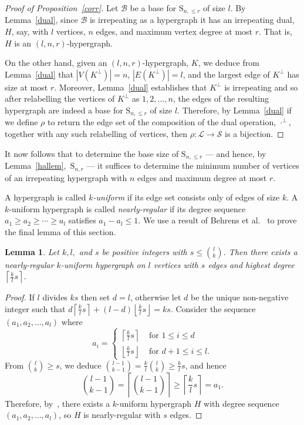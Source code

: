 \documentclass[10pt,a4paper]{amsart}
\renewcommand\S{\mathrm{S}}
\theoremstyle{plain}
\newtheorem{lemma}[cdrthm]{Lemma}
\theoremstyle{definition}
\theoremstyle{remark}
\begin{document}
\begin{proof}[Proof of Proposition~\ref{corr}]
Let $\mathcal{B}$ be a base for $\S_{n,\leq r}$ of size $l$. By Lemma~\ref{dual}, since $\mathcal{B}$ is irrepeating as a hypergraph it has an irrepeating dual, $H$, say, with $l$ vertices, $n$ edges, and maximum vertex degree at most $r$. That is, $H$ is an $(l,n,r)$-hypergraph. 

On the other hand, given an $(l,n,r)$-hypergraph, $K$, we deduce from Lemma~\ref{dual} that $|V(K^\perp)|=n$, $|E(K^\perp)|=l$, and the largest edge of $K^\perp$ has size at most $r$. Moreover, Lemma~\ref{dual} establishes that $K^\perp$ is irrepeating and so after relabelling the vertices of $K^\perp$ as $1,2,\dots,n$, the edges of the resulting hypergraph are indeed a base for $\S_{n,\leq r}$ of size $l$. Therefore, by Lemma~\ref{dual} if we define $\rho$ to return the edge set of the composition of the dual operation, $\cdot^\perp$, together with any such relabelling of vertices, then $\rho:\mathcal{L}\to\mathcal{S}$ is a bijection.
\end{proof}

It now follows that to determine the base size of $\S_{n,\leq r}$ --- and hence, by Lemma~\ref{hallem},~$\S_{n,r}$ --- it suffices to determine the minimum number of vertices of an irrepeating hypergraph with $n$ edges and maximum degree at most $r$. 

A hypergraph is called \emph{$k$-uniform} if its edge set consists only of edges of size $k$. A $k$-uniform hypergraph is called \emph{nearly-regular} if its degree sequence $a_1\geq a_2\geq\cdots\geq a_l$ satisfies $a_1-a_l\leq 1$. We use a result of Behrens et al.~\cite{beh} to prove the final lemma of this section.

\begin{lemma}\label{kexist}
Let $k,l,$ and $s$ be positive integers with $s\leq\binom{l}{k}$. Then there exists a nearly-regular $k$-uniform hypergraph on $l$ vertices with $s$ edges and highest degree $\left\lceil\frac{k}{l}s\right\rceil$.
\end{lemma}

\begin{proof}
If $l$ divides $ks$ then set $d=l$, otherwise let $d$ be the unique non-negative integer such that $d\left\lceil\frac{k}{l}s\right\rceil+(l-d)\left\lfloor\frac{k}{l}s\right\rfloor=ks$. Consider the sequence $(a_1,a_2,\dots,a_l)$ where $$a_i=\begin{cases}\left\lceil\frac{k}{l}s\right\rceil&\text{ for $1\leq i\leq d$}\\\left\lfloor\frac{k}{l}s\right\rfloor&\text{ for $d+1\leq i\leq l$}.\end{cases}$$ From $\binom{l}{k}\geq s$, we deduce $\binom{l-1}{k-1}=\frac{k}{l}\binom{l}{k}\geq\frac{k}{l}s$, and hence $$\binom{l-1}{k-1}=\left\lceil\binom{l-1}{k-1}\right\rceil\geq \left\lceil\frac{k}{l}s\right\rceil =a_1.$$ Therefore, by~\cite[Theorem 2.1]{beh}, there exists a $k$-uniform hypergraph $H$ with degree sequence $(a_1,a_2,\dots, a_l)$, so $H$ is nearly-regular with $s$ edges.
\end{proof}
\end{document}
